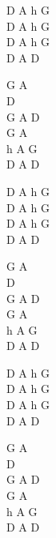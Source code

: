 \begin{chord}
    D A h G\\ 
    D A h G\\
    D A h G\\
    D A D 

    G A \\
    D \\
    G A D\\
    G A \\
    h A G\\
    D A D 

    D A h G\\ 
    D A h G\\
    D A h G\\
    D A D 

    G A \\
    D \\
    G A D\\
    G A \\
    h A G\\
    D A D 

    D A h G\\
    D A h G\\
    D A h G\\
    D A D 

    G A \\
    D \\
    G A D\\
    G A \\
    h A G\\
    D A D 
\end{chord}
